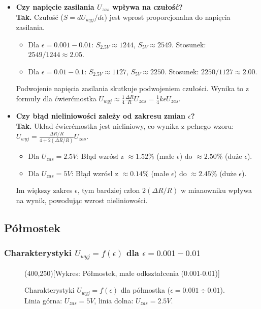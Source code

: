 \documentclass[12pt, a4paper]{article}
\begin{document}
	\begin{itemize}
		\item \textbf{Czy napięcie zasilania $U_{zas}$ wpływa na czułość?} \\
		\textbf{Tak.} Czułość ($S = dU_{wyj}/d\epsilon$) jest wprost proporcjonalna do napięcia zasilania.
		\begin{itemize}
			\item Dla $\epsilon=0.001-0.01$: $S_{2.5V} \approx 1244$, $S_{5V} \approx 2549$. Stosunek: $2549 / 1244 \approx 2.05$.
			\item Dla $\epsilon=0.01-0.1$: $S_{2.5V} \approx 1127$, $S_{5V} \approx 2250$. Stosunek: $2250 / 1127 \approx 2.00$.
		\end{itemize}
		Podwojenie napięcia zasilania skutkuje podwojeniem czułości.  Wynika to z formuły dla ćwierćmostka $U_{wyj} \approx \frac{1}{4} \frac{\Delta R}{R} U_{zas} = \frac{1}{4} k \epsilon U_{zas}$.
		
		\item \textbf{Czy błąd nieliniowości zależy od zakresu zmian $\epsilon$?} \\
		 \textbf{Tak.} Układ ćwierćmostka jest nieliniowy, co wynika z pełnego wzoru: $U_{wyj} = \frac{\Delta R/R}{4+2(\Delta R/R)} U_{zas}$.
		\begin{itemize}
			\item Dla $U_{zas} = 2.5 V$: Błąd wzrósł z $\approx 1.52 \%$ (małe $\epsilon$) do $\approx 2.50 \%$ (duże $\epsilon$).
			\item Dla $U_{zas} = 5 V$: Błąd wzrósł z $\approx 0.14 \%$ (małe $\epsilon$) do $\approx 2.45 \%$ (duże $\epsilon$).
		\end{itemize}
		Im większy zakres $\epsilon$, tym bardziej człon $2(\Delta R/R)$ w mianowniku wpływa na wynik, powodując wzrost nieliniowości.
	\end{itemize}
	
	\subsection{Półmostek}
	
	\subsubsection{Charakterystyki $U_{wyj} = f(\epsilon)$ dla $\epsilon = 0.001-0.01$}
	
	\begin{figure}[H]
		\centering
		\framebox(400,250){[Wykres: Półmostek, małe odkształcenia (0.001-0.01)]}
		\caption{Charakterystyki $U_{wyj} = f(\epsilon)$ dla półmostka ($\epsilon = 0.001 \div 0.01$).  Linia górna: $U_{zas} = 5 V$, linia dolna: $U_{zas} = 2.5 V$.}
	\end{figure}
	
\end{document}
